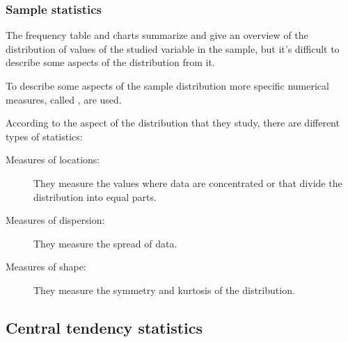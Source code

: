 \begin{frame}
\frametitle{Sample statistics}
The frequency table and charts summarize and give an overview of the distribution of values of the studied variable in
the sample, but it's difficult to describe some aspects of the distribution from it. 

To describe some aspects of the sample distribution more specific numerical measures, called
, are used.

According to the aspect of the distribution that they study, there are different types of statistics:
\begin{description}
\item[Measures of locations:] They measure the values where data are concentrated or that divide the distribution into
equal parts. 
\item[Measures of dispersion:] They measure the spread of data.
\item[Measures of shape:] They measure the symmetry and kurtosis of the distribution.  
\end{description}
\end{frame}


\subsection{Central tendency statistics}

